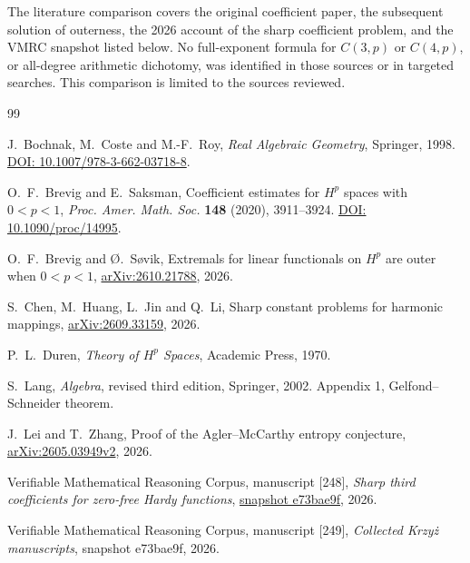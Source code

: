 \documentclass[11pt]{article}
\begin{document}
The literature comparison covers the original coefficient paper,
the subsequent solution of outerness, the 2026 account of the
sharp coefficient problem, and the VMRC snapshot listed below.
No full-exponent formula for \(C(3,p)\) or \(C(4,p)\), or
all-degree arithmetic dichotomy, was identified in those sources
or in targeted searches. This comparison is limited to the sources
reviewed.

\small
\begin{thebibliography}{99}
\setlength{\itemsep}{2pt}

J.~Bochnak, M.~Coste and M.-F.~Roy, \emph{Real Algebraic Geometry},
Springer, 1998.
\href{https://doi.org/10.1007/978-3-662-03718-8}{DOI: 10.1007/978-3-662-03718-8}.

O.~F.~Brevig and E.~Saksman, Coefficient estimates for \(H^p\)
spaces with \(0<p<1\), \emph{Proc. Amer. Math. Soc.} \textbf{148}
(2020), 3911--3924.
\href{https://doi.org/10.1090/proc/14995}{DOI: 10.1090/proc/14995}.

O.~F.~Brevig and \O.~S{\o}vik, Extremals for linear functionals on
\(H^p\) are outer when \(0<p<1\),
\href{https://arxiv.org/abs/2610.21788}{arXiv:2610.21788}, 2026.

S.~Chen, M.~Huang, L.~Jin and Q.~Li, Sharp constant problems for
harmonic mappings, \href{https://arxiv.org/abs/2609.33159}{arXiv:2609.33159}, 2026.

P.~L.~Duren, \emph{Theory of \(H^p\) Spaces}, Academic Press, 1970.

S.~Lang, \emph{Algebra}, revised third edition, Springer, 2002.
Appendix 1, Gelfond--Schneider theorem.

J.~Lei and T.~Zhang, Proof of the Agler--McCarthy entropy conjecture,
\href{https://arxiv.org/abs/2605.03949v2}{arXiv:2605.03949v2}, 2026.

Verifiable Mathematical Reasoning Corpus, manuscript [248],
\emph{Sharp third coefficients for zero-free Hardy functions},
\href{https://github.com/QEEDDD/Verifiable-Mathematical-Reasoning-Corpus/tree/e73bae9fd0c319129b19aacc5c317f7abf2865ef}{snapshot e73bae9f},
2026.

Verifiable Mathematical Reasoning Corpus, manuscript [249],
\emph{Collected Krzy\.{z} manuscripts}, snapshot e73bae9f, 2026.

\end{thebibliography}
\end{document}
